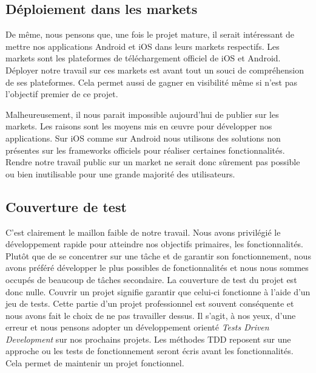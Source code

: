 \subsection{Déploiement dans les markets}

De même, nous pensons que, une fois le projet mature, il serait intéressant de mettre nos applications Android et iOS dans 
leurs markets respectifs. Les markets sont les plateformes de téléchargement officiel de iOS et Android. Déployer notre 
travail sur ces markets est avant tout un souci de compréhension de ses plateformes. Cela permet aussi de gagner en visibilité
même si n'est pas l'objectif premier de ce projet.

Malheureusement, il nous parait impossible aujourd'hui de publier sur les markets. Les raisons sont les moyens mis en œuvre 
pour développer nos applications. Sur iOS comme sur Android nous utilisons des solutions non présentes sur les frameworks officiels
pour réaliser certaines fonctionnalités. Rendre notre travail public sur un market ne serait donc sûrement pas possible ou bien
inutilisable pour une grande majorité des utilisateurs.




\subsection{Couverture de test}

C'est clairement le maillon faible de notre travail. Nous avons privilégié le développement rapide pour atteindre nos objectifs
primaires, les fonctionnalités. Plutôt que de se concentrer sur une tâche et de garantir son fonctionnement, nous avons préféré
développer le plus possibles de fonctionnalités et nous nous sommes occupés de beaucoup de tâches secondaire. La couverture 
de test du projet est donc nulle. Couvrir un projet signifie garantir que celui-ci fonctionne à l'aide d'un jeu de tests. Cette partie
d'un projet professionnel est souvent conséquente et nous avons fait le choix de ne pas travailler dessus. Il s'agit, à nos yeux, 
d'une erreur et nous pensons adopter un développement orienté \textit{Tests Driven Development} sur nos prochains projets. Les méthodes
TDD reposent sur une approche ou les tests de fonctionnement seront écris avant les fonctionnalités. Cela permet de maintenir un projet
fonctionnel.



